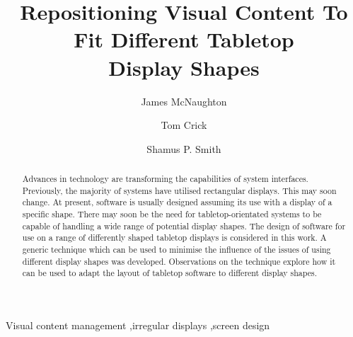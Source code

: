 \documentclass[review,5p,times,twocolumn]{elsarticle}
\begin{document}
\begin{frontmatter}



\title{Repositioning Visual Content To Fit Different Tabletop\\Display Shapes}


\author[durham]{James McNaughton}
\author[cardiff]{Tom Crick}
\author[newcastleEng]{Shamus P. Smith}


\address[durham]{Technology Enhanced Learning Special Interest Group, School of Education, Durham University, South Road, Durham, DH1 3LE, UK}
\address[cardiff]{Department of Computing \& Information Systems, Cardiff Metropolitan University, Cardiff, CF5 2YB, UK}
\address[newcastleEng]{ES248, Callaghan, University Drive, Callaghan NSW 2308, Australia}


\begin{abstract}
Advances in technology are transforming the capabilities of system interfaces.
Previously, the majority of systems have utilised rectangular displays.
This may soon change.
At present, software is usually designed assuming its use with a display of a specific shape.
There may soon be the need for tabletop-orientated systems to be capable of handling a wide range of potential display shapes.
The design of software for use on a range of differently shaped tabletop displays is considered in this work.
A generic technique which can be used to minimise the influence of the issues of using different display shapes was developed.
Observations on the technique explore how it can be used to adapt the layout of tabletop software to different display shapes.
\end{abstract}


\begin{keyword}
Visual content management \sep irregular displays \sep screen design
\end{keyword}


\end{frontmatter}
\end{document}

